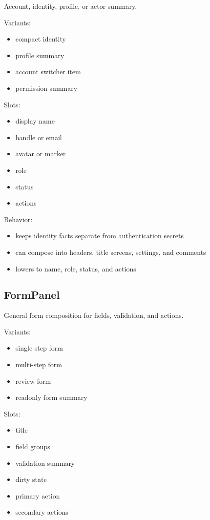 Account, identity, profile, or actor summary.

Variants:

\begin{itemize}
\tightlist
\item
  compact identity
\item
  profile summary
\item
  account switcher item
\item
  permission summary
\end{itemize}

Slots:

\begin{itemize}
\tightlist
\item
  display name
\item
  handle or email
\item
  avatar or marker
\item
  role
\item
  status
\item
  actions
\end{itemize}

Behavior:

\begin{itemize}
\tightlist
\item
  keeps identity facts separate from authentication secrets
\item
  can compose into headers, title screens, settings, and comments
\item
  lowers to name, role, status, and actions
\end{itemize}

\subsection{FormPanel}\label{record-128-formpanel}

General form composition for fields, validation, and actions.

Variants:

\begin{itemize}
\tightlist
\item
  single step form
\item
  multi-step form
\item
  review form
\item
  readonly form summary
\end{itemize}

Slots:

\begin{itemize}
\tightlist
\item
  title
\item
  field groups
\item
  validation summary
\item
  dirty state
\item
  primary action
\item
  secondary actions
\end{itemize}

